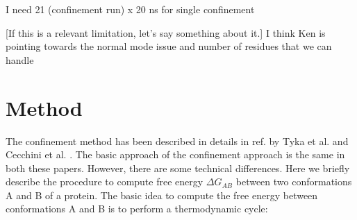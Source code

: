 \documentclass[12pt]{article}
\newcommand{\Arijit}[1]{\color{magenta}#1\normalcolor}
\newcommand{\Ken}[1]{\color{red}#1\normalcolor}
\begin{document}
\Arijit{I need 21 (confinement run) x 20 ns for single confinement}

\Ken{[If this is a relevant limitation, let's say something about it.]}
\Arijit{I think Ken is pointing towards the normal mode issue and number of residues that we can handle}


\section{Method}

The confinement method has been described in details in ref. by Tyka et al. \cite{Tyka2006} and
Cecchini et  al. \cite{Cecchini2009}. The basic approach of the confinement approach is the same in
both these papers. However, there are some technical differences. Here we briefly describe the
procedure to compute free energy $\Delta G_{AB}$ between two conformations A and B of a protein. The
basic idea to compute the free energy between conformations A and B is to perform a thermodynamic
cycle:
\end{document}
